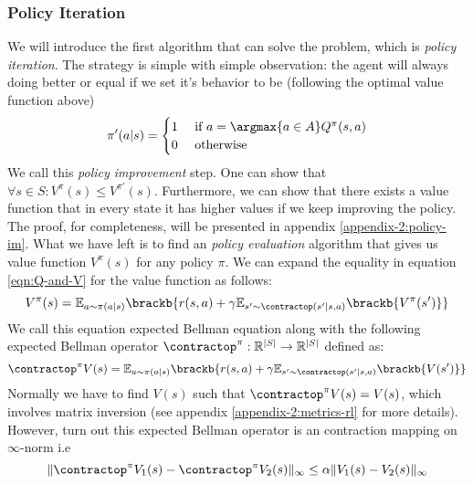 \subsubsection{Policy Iteration}
We will introduce the first algorithm that can solve the problem, which is \textit{policy iteration}. The strategy is simple with simple observation: the agent will always doing better or equal if we set it's behavior to be (following the optimal value function above)
\begin{equation}
    \label{eqn:greedy-Q}
    \pi'(a | s) = \begin{cases}
        1 &\text{ if } a = \argmax{a \in A} Q^\pi(s, a) \\
        0 &\text{ otherwise }
    \end{cases}
\end{equation}
We call this \textit{policy improvement} step. One can show that $\forall s \in S: V^\pi(s) \le V^{\pi'}(s)$. Furthermore, we can show that there exists a value function that in every state it has higher values if we keep improving the policy. The proof, for completeness, will be presented in appendix \ref{appendix-2:policy-im}. What we have left is to find an \textit{policy evaluation} algorithm that gives us value function $V^{\pi}(s)$ for any policy $\pi$. We can expand the equality in equation \ref{eqn:Q-and-V} for the value function as follows:
\begin{equation}
    V^\pi(s) = \mathbb{E}_{a \sim \pi(a | s)} \brackb{r(s, a) + \gamma \mathbb{E}_{s' \sim \contractop(s' | s, a)}\brackb{V^\pi(s')}} 
\end{equation}
We call this equation expected Bellman equation along with the following expected Bellman operator $\contractop^{\pi} : \mathbb{R}^{|S|} \rightarrow \mathbb{R}^{|S|}$ defined as:
\begin{equation}
    \label{eqn:exp-bellman-operator}
    \contractop^{\pi} V(s) = \mathbb{E}_{a \sim \pi(a | s)} \brackb{r(s, a) + \gamma \mathbb{E}_{s' \sim \contractop(s' | s, a)}\brackb{V(s')}} 
\end{equation}
Normally we have to find $V(s)$ such that $\contractop^\pi V(s) = V(s)$, which involves matrix inversion (see appendix \ref{appendix-2:metrics-rl} for more details). However, turn out this expected Bellman operator is an contraction mapping on $\infty$-norm i.e 
\begin{equation*}
    \| \contractop^\pi V_1(s) - \contractop^\pi V_2(s) \|_\infty \le \alpha \|V_1(s) - V_2(s)\|_\infty
\end{equation*}
